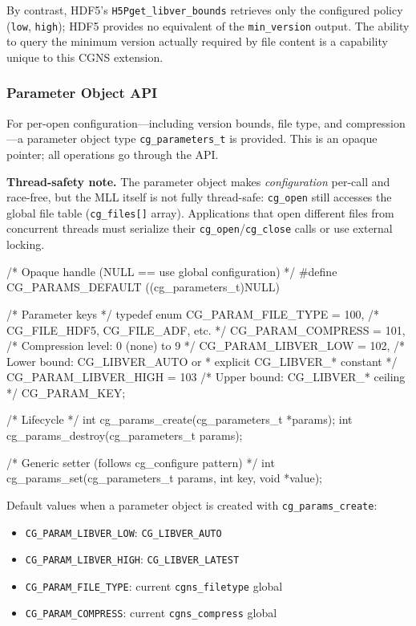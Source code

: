 \documentclass[11pt,letterpaper]{article}
\makeatletter
\let\cgns@orig@lstlisting\lstlisting
\let\cgns@endorig@lstlisting\endlstlisting
\renewenvironment{lstlisting}
  {\par\needspace{5\baselineskip}\nolinenumbers\cgns@orig@lstlisting}
  {\cgns@endorig@lstlisting\par\linenumbers}
\makeatother
\begin{document}
By contrast, HDF5's \texttt{H5Pget\_libver\_bounds} retrieves only
the configured policy (\texttt{low}, \texttt{high}); HDF5 provides no
equivalent of the \texttt{min\_version} output.  The ability to query
the minimum version actually required by file content is a capability
unique to this CGNS extension.

\subsubsection{Parameter Object API}
\label{sec:params-api}

For per-open configuration---including version bounds,
file type, and compression---a parameter object type
\texttt{cg\_parameters\_t} is provided.  This is an opaque pointer;
all operations go through the API.

\textbf{Thread-safety note.}  The parameter object makes
\emph{configuration} per-call and race-free, but the MLL itself is
not fully thread-safe: \texttt{cg\_open} still accesses the global
file table (\texttt{cg\_files[]} array).  Applications that open
different files from concurrent threads must serialize their
\texttt{cg\_open}/\texttt{cg\_close} calls or use external locking.

\begin{lstlisting}[language=C]
/* Opaque handle (NULL == use global configuration) */
#define CG_PARAMS_DEFAULT ((cg_parameters_t)NULL)

/* Parameter keys */
typedef enum {
    CG_PARAM_FILE_TYPE    = 100, /* CG_FILE_HDF5, CG_FILE_ADF, etc. */
    CG_PARAM_COMPRESS     = 101, /* Compression level: 0 (none) to 9 */
    CG_PARAM_LIBVER_LOW   = 102, /* Lower bound: CG_LIBVER_AUTO or
                                  * explicit CG_LIBVER_* constant */
    CG_PARAM_LIBVER_HIGH  = 103  /* Upper bound: CG_LIBVER_* ceiling */
} CG_PARAM_KEY;

/* Lifecycle */
int cg_params_create(cg_parameters_t *params);
int cg_params_destroy(cg_parameters_t  params);

/* Generic setter (follows cg_configure pattern) */
int cg_params_set(cg_parameters_t params, int key, void *value);
\end{lstlisting}

Default values when a parameter object is created with
\texttt{cg\_params\_create}:

\begin{itemize}[leftmargin=2em]
\item \texttt{CG\_PARAM\_LIBVER\_LOW}: \texttt{CG\_LIBVER\_AUTO}
\item \texttt{CG\_PARAM\_LIBVER\_HIGH}: \texttt{CG\_LIBVER\_LATEST}
\item \texttt{CG\_PARAM\_FILE\_TYPE}: current \texttt{cgns\_filetype} global
\item \texttt{CG\_PARAM\_COMPRESS}: current \texttt{cgns\_compress} global
\end{itemize}
\end{document}

